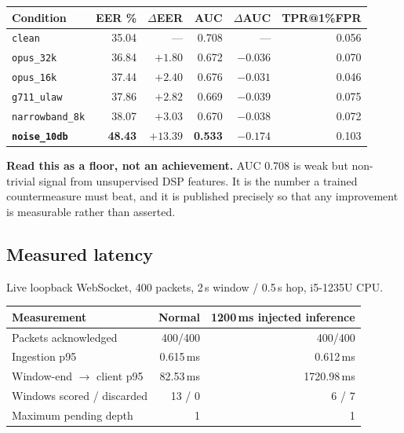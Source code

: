\documentclass[11pt,a4paper]{article}
\begin{document}
\begin{center}
\begin{tabular}{@{}lrrrrr@{}}
\toprule
\textbf{Condition} & \textbf{EER \%} & \textbf{$\Delta$EER} & \textbf{AUC} & \textbf{$\Delta$AUC} & \textbf{TPR@1\%FPR}\\
\midrule
\texttt{clean}          & 35.04 & ---    & 0.708 & ---     & 0.056\\
\texttt{opus\_32k}      & 36.84 & $+1.80$ & 0.672 & $-0.036$ & 0.070\\
\texttt{opus\_16k}      & 37.44 & $+2.40$ & 0.676 & $-0.031$ & 0.046\\
\texttt{g711\_ulaw}     & 37.86 & $+2.82$ & 0.669 & $-0.039$ & 0.075\\
\texttt{narrowband\_8k} & 38.07 & $+3.03$ & 0.670 & $-0.038$ & 0.072\\
\textbf{\texttt{noise\_10db}} & \textbf{48.43} & $\mathbf{+13.39}$ & \textbf{0.533} & $\mathbf{-0.174}$ & 0.103\\
\bottomrule
\end{tabular}
\end{center}

\textbf{Read this as a floor, not an achievement.} AUC 0.708 is weak but
non-trivial signal from unsupervised DSP features. It is the number a trained
countermeasure must beat, and it is published precisely so that any improvement
is measurable rather than asserted.

\subsection{Measured latency}

Live loopback WebSocket, 400 packets, 2\,s window / 0.5\,s hop, i5-1235U CPU.

\begin{center}
\begin{tabular}{@{}lrr@{}}
\toprule
\textbf{Measurement} & \textbf{Normal} & \textbf{1200\,ms injected inference}\\
\midrule
Packets acknowledged & 400/400 & 400/400\\
Ingestion p95 & 0.615\,ms & 0.612\,ms\\
Window-end $\to$ client p95 & 82.53\,ms & 1720.98\,ms\\
Windows scored / discarded & 13 / 0 & 6 / 7\\
Maximum pending depth & 1 & 1\\
\bottomrule
\end{tabular}
\end{center}
\end{document}
